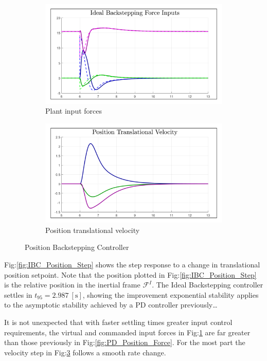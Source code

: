 \begin{figure}[htbp]\ContinuedFloat
\begin{subfigure}{0.49\textwidth}
\centering
\includegraphics[width=\textwidth]{graphs/IBC_Position_Force}
\caption{Plant input forces}
\label{fig:IBC_Position_Force}
\end{subfigure}
\begin{subfigure}{0.49\textwidth}
\centering
\includegraphics[width=\textwidth]{graphs/IBC_Position_Velocity}
\caption{Position translational velocity}
\label{fig:IBC_Position_Velocity}
\end{subfigure}
\caption{Position Backstepping Controller}
\end{figure}
\par
Fig:\ref{fig:IBC_Position_Step} shows the step response to a change in translational position setpoint. Note that the position plotted in Fig:\ref{fig:IBC_Position_Step} is the relative position in the inertial frame $\mathcal{F}^{I}$. The Ideal Backstepping controller settles in $t_{95}=2.987~[\text{s}]$, showing the improvement exponential stability applies to the asymptotic stability achieved by a PD controller previously\ldots
\par
It is not unexpected that with faster settling times greater input control requirements, the virtual and commanded input forces in Fig:\ref{fig:IBC_Position_Force} are far greater than those previously in Fig:\ref{fig:PD_Position_Force}. For the most part the velocity step in Fig:\ref{fig:IBC_Position_Velocity} follows a smooth rate change.

